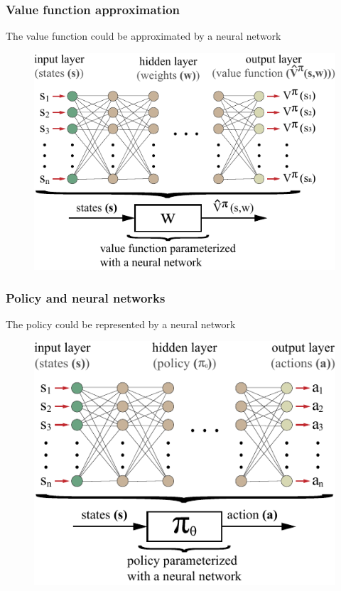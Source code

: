 \begin{frame}
	\frametitle{Value function approximation}
	The value function could be approximated by a neural network

	\begin{figure}
		\includegraphics{value_function_cnn.pdf}
	\end{figure}
	
\end{frame}

\begin{frame}
	\frametitle{Policy and neural networks}
	
	The policy could be represented by a neural network

	\begin{figure}
		\centering
		\includegraphics{policy_cnn.pdf}
	\end{figure}

\end{frame}

